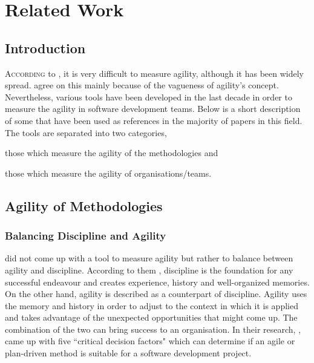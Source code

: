 \chapter{Related Work}\label{ch:related_work}


\section{Introduction}
\lettrine[lines=4, loversize=-0.1, lraise=0.1]{A}{ccording} to \citet{yauch}, it is very difficult to measure agility, although it has been widely spread. \citet{tsourveloudis} agree on this mainly because of the vagueness of agility's concept. Nevertheless, various tools have been developed in the last decade in order to measure the agility in software development teams. Below is a short description of some that have been used as references in the majority of papers in this field. The tools are separated into two categories, 
\begin{inparaenum} [a\upshape)]
\item those which measure the agility of the methodologies and
\item those which measure the agility of organisations/teams.
\end{inparaenum}

\section{Agility of Methodologies}

\subsection{Balancing Discipline and Agility}
\citet{1231450} did not come up with a tool to measure agility but rather to balance between agility and discipline. According to them \cite{1317503}, discipline is the foundation for any successful endeavour and creates experience, history and well-organized memories. On the other hand, agility is described as a counterpart of discipline. Agility uses the memory and history in order to adjust to the context in which it is applied and takes advantage of the unexpected opportunities that might come up. The combination of the two can bring success to an organisation. In their research, \citet{1231450}, came up with five ``critical decision factors" which can determine if an agile or plan-driven method is suitable for a software development project.

